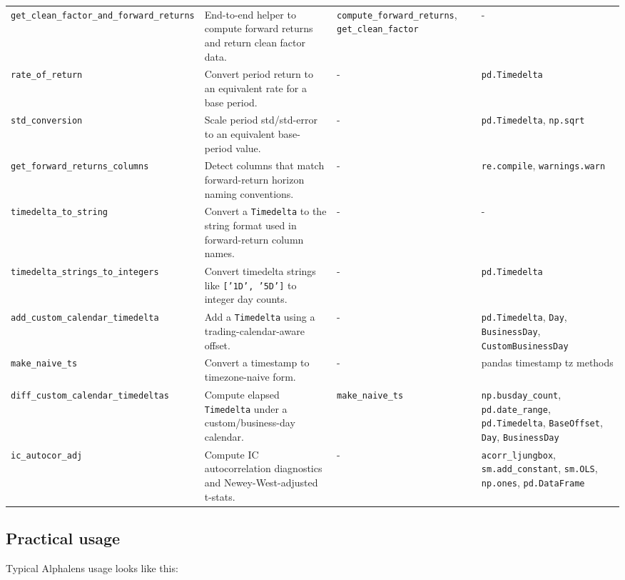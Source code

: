 \documentclass[11pt]{article}
\begin{document}
\begin{center}
\begin{tabular}{>{\raggedright\arraybackslash}p{2.6cm} >{\raggedright\arraybackslash}p{3.8cm} >{\raggedright\arraybackslash}p{3.8cm} >{\raggedright\arraybackslash}p{4.0cm}}
\texttt{get\_clean\_factor\_and\_forward\_returns} & End-to-end helper to compute forward returns and return clean factor data. & \texttt{compute\_forward\_returns}, \texttt{get\_clean\_factor} & - \\
\texttt{rate\_of\_return} & Convert period return to an equivalent rate for a base period. & - & \texttt{pd.Timedelta} \\
\texttt{std\_conversion} & Scale period std/std-error to an equivalent base-period value. & - & \texttt{pd.Timedelta}, \texttt{np.sqrt} \\
\texttt{get\_forward\_returns\_columns} & Detect columns that match forward-return horizon naming conventions. & - & \texttt{re.compile}, \texttt{warnings.warn} \\
\texttt{timedelta\_to\_string} & Convert a \texttt{Timedelta} to the string format used in forward-return column names. & - & - \\
\texttt{timedelta\_strings\_to\_integers} & Convert timedelta strings like \texttt{['1D', '5D']} to integer day counts. & - & \texttt{pd.Timedelta} \\
\texttt{add\_custom\_calendar\_timedelta} & Add a \texttt{Timedelta} using a trading-calendar-aware offset. & - & \texttt{pd.Timedelta}, \texttt{Day}, \texttt{BusinessDay}, \texttt{CustomBusinessDay} \\
\texttt{make\_naive\_ts} & Convert a timestamp to timezone-naive form. & - & pandas timestamp tz methods \\
\texttt{diff\_custom\_calendar\_timedeltas} & Compute elapsed \texttt{Timedelta} under a custom/business-day calendar. & \texttt{make\_naive\_ts} & \texttt{np.busday\_count}, \texttt{pd.date\_range}, \texttt{pd.Timedelta}, \texttt{BaseOffset}, \texttt{Day}, \texttt{BusinessDay} \\
\texttt{ic\_autocor\_adj} & Compute IC autocorrelation diagnostics and Newey-West-adjusted t-stats. & - & \texttt{acorr\_ljungbox}, \texttt{sm.add\_constant}, \texttt{sm.OLS}, \texttt{np.ones}, \texttt{pd.DataFrame} \\
\bottomrule
\end{tabular}
\end{center}
\normalsize

\subsection{Practical usage}

Typical Alphalens usage looks like this:
\end{document}
